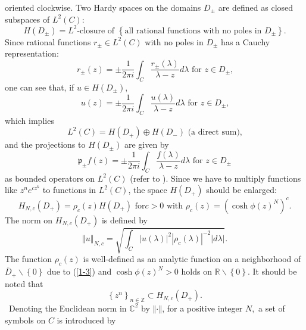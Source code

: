 \documentclass[a4paper]{article}%
\begin{document}
oriented clockwise. Two Hardy spaces on the domains $D_{\pm}$ are defined as
closed subspaces of $L^{2}\left(  C\right)  :$%
\[
H\left(  D_{\pm}\right)  =L^{2}\text{-closure of }\left\{  \text{all rational
functions with no poles in }D_{\pm}\right\}  \text{.}%
\]
Since rational functions $r_{\pm}\in L^{2}\left(  C\right)  $ with no poles in
$D_{\pm}$ has a Cauchy representation:%
\[
r_{\pm}\left(  z\right)  =\pm\dfrac{1}{2\pi i}\int_{C}\dfrac{r_{\pm}\left(
\lambda\right)  }{\lambda-z}d\lambda\text{ \ for }z\in D_{\pm}\text{,}%
\]
one can see that, if $u\in H\left(  D_{\pm}\right)  $,
\[
u\left(  z\right)  =\pm\dfrac{1}{2\pi i}\int_{C}\dfrac{u\left(  \lambda
\right)  }{\lambda-z}d\lambda\text{ \ for }z\in D_{\pm}\text{,}%
\]
which implies%
\[
L^{2}\left(  C\right)  =H\left(  D_{+}\right)  \oplus H\left(  D_{-}\right)
\text{ \ (a direct sum),}%
\]
and the projections to $H\left(  D_{\pm}\right)  $ are given by%
\[
\mathfrak{p}_{\pm}f\left(  z\right)  =\pm\dfrac{1}{2\pi i}\int_{C}%
\dfrac{f\left(  \lambda\right)  }{\lambda-z}d\lambda\text{ \ for }z\in D_{\pm}%
\]
as bounded operators on $L^{2}\left(  C\right)  $ (refer to \cite{v}). Since
we have to multiply functions like $z^{n}e^{cz^{k}}$ to functions in
$L^{2}\left(  C\right)  $, the space $H\left(  D_{+}\right)  $ should be
enlarged:%
\[
H_{N,c}\left(  D_{+}\right)  =\rho_{c}(z)H\left(  D_{+}\right)  \text{ \ for
}c>0\text{ \ with }\rho_{c}(z)=\left(  \cosh\phi\left(  z\right)  ^{N}\right)
^{c}\text{.}%
\]
The norm on $H_{N,c}\left(  D_{+}\right)  $ is defined by%
\[
\left\Vert u\right\Vert _{N,c}=\sqrt{\int_{C}\left\vert u\left(
\lambda\right)  \right\vert ^{2}\left\vert \rho_{c}(\lambda)\right\vert
^{-2}\left\vert d\lambda\right\vert }\text{.}%
\]
The function $\rho_{c}(z)$ is well-defined as an analytic function on a
neighborhood of $\overline{D}_{+}\backslash\left\{  0\right\}  $ due to
(\ref{1-3}) and $\cosh\phi\left(  z\right)  ^{N}>0$ holds on $\mathbb{R}%
\backslash\left\{  0\right\}  $. It should be noted that%
\[
\left\{  z^{n}\right\}  _{n\in\mathbb{Z}}\subset H_{N,c}\left(  D_{+}\right)
\text{.}%
\]
\ Denoting the Euclidean norm in $\mathbb{C}^{2}$ by $\left\Vert
\cdot\right\Vert $, for a positive integer $N$,\ a set of symbols on $C$ is
introduced by%
\end{document}
